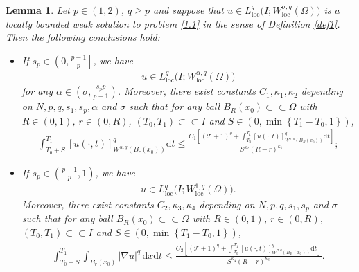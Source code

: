 \documentclass[reqno,10pt]{amsart}
\numberwithin{equation}{section}
\newtheorem{lemma}[theorem]{Lemma}
\begin{document}
\begin{lemma}
	\label{lem20}
	Let $p\in(1,2)$, $q\ge p$ and suppose that $u\in L^q_{\mathrm{loc}}\bigl(I;W^{\sigma,q}_{\mathrm{loc}}(\Omega)\bigl)$ is a locally bounded weak solution to problem \eqref{1.1} in the sense of Definition \ref{def1}. Then the following conclusions hold:
	\begin{itemize}
		\item[(i)] If $s_p\in\left(0,\frac{p-1}{p}\right]$, we have
		\begin{align*}
			u\in L^q_{\mathrm{loc}}\bigl(I;W^{\alpha,q}_{\mathrm{loc}}(\Omega)\bigl)
		\end{align*}
		for any $\alpha\in\left( \sigma,\frac{s_pp}{p-1}\right) $. Moreover, there exist constants $C_1,\kappa_1,\kappa_2$ depending on $N,p,q,s_1,s_p,\alpha$ and $\sigma$ such that for any ball $B_R(x_0)\subset\subset\Omega$ with $R\in(0,1)$, $r\in (0,R)$, $(T_0,T_1)\subset\subset I$ and $S\in \left( 0,\min\left\lbrace T_1-T_0,1\right\rbrace \right) $,
		\begin{align*}
			\int_{T_0+S}^{T_1}[u(\cdot,t)]^q_{W^{\alpha,q}\left( B_r(x_0)\right) }\mathrm{d}t\le\frac{C_1\left[\left(\mathcal{T}+1\right)^q+\int_{T_0}^{T_1}[u(\cdot,t)]^q_{W^{\sigma,q}\left( B_R(x_0)\right)}\mathrm{d}t\right]}{S^{\kappa_2}(R-r)^{\kappa_1}};
		\end{align*}
		\item[(ii)] If $s_p\in \left(\frac{p-1}{p},1\right)$, we have
		\begin{align*}
			u\in L^q_{\mathrm{loc}}\bigl(I;W^{1,q}_{\mathrm{loc}}(\Omega)\bigl).
		\end{align*}
		Moreover, there exist constants $C_2,\kappa_3,\kappa_4$ depending on $N,p,q,s_1,s_p$ and $\sigma$ such that for any ball $B_R(x_0)\subset\subset\Omega$ with $R\in(0,1)$, $r\in (0,R)$, $(T_0,T_1)\subset\subset I$ and $S\in \left( 0,\min\left\lbrace T_1-T_0,1\right\rbrace \right) $,
		\begin{align*}
			\int_{T_0+S}^{T_1}\int_{B_r(x_0)}|\nabla u|^q\,\mathrm{d}x\mathrm{d}t\le\frac{C_2\left[\left(\mathcal{T}+1\right)^q+\int_{T_0}^{T_1}[u(\cdot,t)]^q_{W^{\sigma,q}\left( B_R(x_0)\right)}\mathrm{d}t\right]}{S^{\kappa_4}(R-r)^{\kappa_3}}.
		\end{align*}
	\end{itemize}
\end{lemma}
\end{document}
